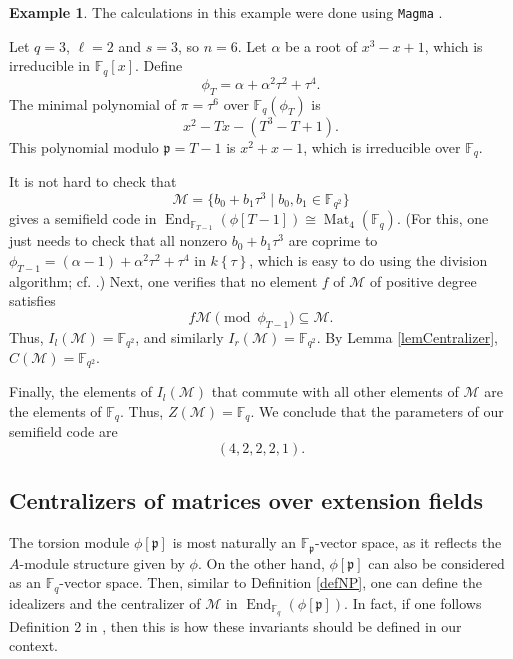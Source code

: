 \documentclass[12pt]{amsart}
\theoremstyle{definition}
\newtheorem{example}[thm]{Example}
\theoremstyle{remark}
\numberwithin{equation}{section}
\numberwithin{thm}{section}
\DeclareMathOperator{\End}{End}
\DeclareMathOperator{\Mat}{Mat}
\newcommand{\fp}{\mathfrak{p}}
\newcommand{\cM}{\mathcal{M}}
\newcommand{\F}{\mathbb{F}}
\newcommand{\twist}[1]{#1\!\left\{\tau\right\}}
\begin{document}
\begin{example} The calculations in this example were done using  \texttt{Magma} \cite{MR1484478}. 
	
	Let $q=3$, $\ell=2$ and $s=3$, so $n=6$. Let $\alpha$ be a root of $x^3-x+1$, which is irreducible in $\F_q[x]$.  Define 
	$$
	\phi_T=\alpha+\alpha^2\tau^2+\tau^4. 
	$$
	The minimal polynomial of $\pi=\tau^6$ over $\F_q(\phi_T)$ is 
	$$
	x^2-Tx-(T^3-T+1). 
	$$
	This polynomial modulo $\fp=T-1$ is $x^2+x-1$, which is irreducible over $\F_q$.
	
	It is not hard to check that 
	$$
	\cM=\{b_0+b_1\tau^3\mid b_0, b_1\in \F_{q^2}\}
	$$
	gives a semifield code in $\End_{\F_{T-1}}(\phi[T-1])\cong \Mat_4(\F_q)$. (For this, one just needs to check that all nonzero $b_0+b_1\tau^3$ 
	are coprime to $\phi_{T-1}=(\alpha-1)+\alpha^2\tau^2+\tau^4$ in $\twist{k}$, which is easy to do using the division algorithm; cf. \cite[Thm. 3.1.13]{PapikianGTM}.) Next, one verifies that no element $f$ of $\cM$ of positive degree satisfies \[f\cM\pmod{\phi_{T-1}}\subseteq \cM.\]
	Thus, $I_l(\cM)=\F_{q^2}$, and similarly $I_r(\cM)=\F_{q^2}$. 
    By Lemma \ref{lemCentralizer}, $C(\cM)=\F_{q^2}$.

	Finally, the elements of $I_l(\cM)$ that commute with all other elements of $\cM$ are the elements of $\F_q$. Thus, $Z(\cM)=\F_q$. We conclude that 
	the parameters of our semifield code are 
	\[
	(4,2,2,2,1). 
	\] 
\end{example}

 
 \subsection{Centralizers of matrices over extension fields} The torsion module $\phi[\fp]$ is most naturally an $\F_\fp$-vector space, as 
 it reflects the $A$-module structure given by $\phi$. On the other hand, $\phi[\fp]$ can also be considered as an $\F_q$-vector space. Then, similar 
 to Definition \ref{defNP},  
 one can define the idealizers and the centralizer of $\cM$ in $\End_{\F_q}(\phi[\fp])$. In fact, if one follows Definition 2 in \cite{Sheekey}, 
 then this is how these invariants should be defined in our context. 
 
\end{document}
